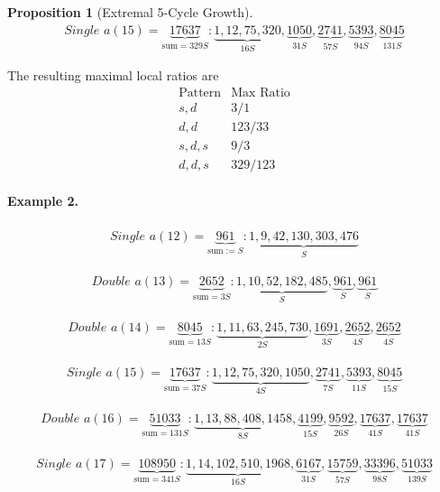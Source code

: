\documentclass[12pt, oneside]{article}
\numberwithin{equation}{section}
\theoremstyle{definition}
\newtheorem{proposition}{Proposition}[section]
\theoremstyle{plain}
\theoremstyle{remark}
\begin{document}
\begin{proposition}[Extremal 5-Cycle Growth]
\[
\begin{array}{l}
\textit{Single } a(15) = \underbrace{17637}_{\text{sum} = 329S}:
\underbrace{1,12,75,320}_{16S},
\underbrace{1050}_{31S},
\underbrace{2741}_{57S},
\underbrace{5393}_{94S},
\underbrace{8045}_{131S}
\end{array}
\]

The resulting maximal local ratios are
\[
\begin{array}{c|c}
\text{Pattern} & \text{Max Ratio} \\
\hline
s,d & 3/1 \\
d,d & 123/33 \\
s,d,s & 9/3 \\
d,d,s & 329/123
\end{array}
\]

\paragraph{Example 2.}
\[
\begin{array}{l}
\textit{Single } a(12) = \underbrace{961}_{\text{sum} := S}:
\underbrace{1,9,42,130,303,476}_{S}
\end{array}
\]

\[
\begin{array}{l}
\textit{Double } a(13) = \underbrace{2652}_{\text{sum} = 3S}:
\underbrace{1,10,52,182,485}_{S},
\underbrace{961}_{S},
\underbrace{961}_{S}
\end{array}
\]

\[
\begin{array}{l}
\textit{Double } a(14) = \underbrace{8045}_{\text{sum} = 13S}:
\underbrace{1,11,63,245,730}_{2S},
\underbrace{1691}_{3S},
\underbrace{2652}_{4S},
\underbrace{2652}_{4S}
\end{array}
\]

\[
\begin{array}{l}
\textit{Single } a(15) = \underbrace{17637}_{\text{sum} = 37S}:
\underbrace{1,12,75,320,1050}_{4S},
\underbrace{2741}_{7S},
\underbrace{5393}_{11S},
\underbrace{8045}_{15S}
\end{array}
\]

\[
\begin{array}{l}
\textit{Double } a(16) = \underbrace{51033}_{\text{sum} = 131S}:
\underbrace{1,13,88,408,1458}_{8S},
\underbrace{4199}_{15S},
\underbrace{9592}_{26S},
\underbrace{17637}_{41S},
\underbrace{17637}_{41S}
\end{array}
\]

\[
\begin{array}{l}
\textit{Single } a(17) = \underbrace{108950}_{\text{sum} = 341S}:
\underbrace{1,14,102,510,1968}_{16S},
\underbrace{6167}_{31S},
\underbrace{15759}_{57S},
\underbrace{33396}_{98S},
\underbrace{51033}_{139S}
\end{array}
\]


\end{proposition}
\end{document}
